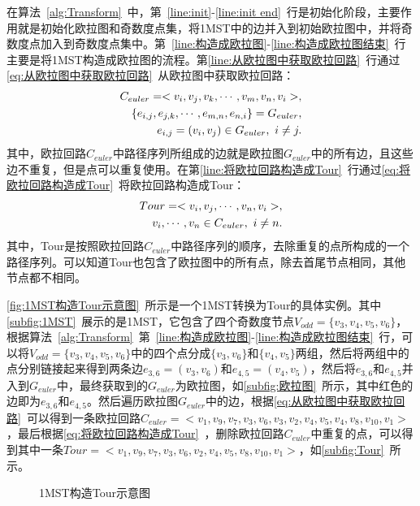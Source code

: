 \par
在算法~\ref{alg:Transform}~中，第~\ref{line:init}-\ref{line:init end}~行是初始化阶段，主要作用就是初始化欧拉图和奇数度点集，将1MST中的边并入到初始欧拉图中，并将奇数度点加入到奇数度点集中。第~\ref{line:构造成欧拉图}-\ref{line:构造成欧拉图结束}~行主要是将1MST构造成欧拉图的流程。第\ref{line:从欧拉图中获取欧拉回路}~行通过\autoref{eq:从欧拉图中获取欧拉回路}~从欧拉图中获取欧拉回路：
\vspace{-.5em}
\begin{align}
    \label{eq:从欧拉图中获取欧拉回路}
    C_{euler} = <v_i, v_j, v_k, \cdots, v_m, v_n, v_i>, \\
    \{e_{i,j}, e_{j,k}, \cdots, e_{m,n}, e_{n,i}\} = G_{euler}, \notag \\ 
    e_{i,j} = (v_i, v_j) \in G_{euler}, \ i \not = j. \notag 
\end{align}
\vspace{-.5em}
其中，欧拉回路$C_{euler}$中路径序列所组成的边就是欧拉图$G_{euler}$中的所有边，且这些边不重复，但是点可以重复使用。在第\ref{line:将欧拉回路构造成Tour}~行通过\autoref{eq:将欧拉回路构造成Tour}~将欧拉回路构造成Tour：
\vspace{-.5em}
\begin{align}
    \label{eq:将欧拉回路构造成Tour}
    Tour = <v_i, v_j, \cdots, v_n, v_i>, \\ 
    v_i, \cdots, v_n \in C_{euler}, \ i \not = n. \notag
\end{align}
其中，Tour是按照欧拉回路$C_{euler}$中路径序列的顺序，去除重复的点所构成的一个路径序列。可以知道Tour也包含了欧拉图中的所有点，除去首尾节点相同，其他节点都不相同。
\par
\autoref{fig:1MST构造Tour示意图}~所示是一个1MST转换为Tour的具体实例。其中\autoref{subfig:1MST}~展示的是1MST，它包含了四个奇数度节点$V_{odd} = \{v_3,v_4,v_5,v_6\}$，根据算法~\ref{alg:Transform}~第~\ref{line:构造成欧拉图}-\ref{line:构造成欧拉图结束}~行，可以将$V_{odd} = \{v_3,v_4,v_5,v_6\}$中的四个点分成$\{v_3,v_6\}$和$\{v_4,v_5\}$两组，然后将两组中的点分别链接起来得到两条边$e_{3,6} = (v_3,v_6)$和$e_{4,5} = (v_4,v_5)$，然后将$e_{3,6}$和$e_{4,5}$并入到$G_{euler}$中，最终获取到的$G_{euler}$为欧拉图，如\autoref{subfig:欧拉图}~所示，其中红色的边即为$e_{3,6}$和$e_{4,5}$。然后遍历欧拉图$G_{euler}$中的边，根据\autoref{eq:从欧拉图中获取欧拉回路}~可以得到一条欧拉回路$C_{euler} = <v_1, v_9, v_7, v_3, v_6, v_3, v_2, v_4, v_5, v_4, v_8, v_{10}, v_1>$，最后根据\autoref{eq:将欧拉回路构造成Tour}~，删除欧拉回路$C_{euler}$中重复的点，可以得到其中一条$Tour = <v_1, v_9, v_7, v_3, v_6, v_2, v_4, v_5, v_8, v_{10}, v_1>$，如\autoref{subfig:Tour}~所示。
\par
\begin{figure}[htb]
    \caption[1MST构造Tour示意图]{1MST构造Tour示意图}
    \label{fig:1MST构造Tour示意图}
\end{figure}

